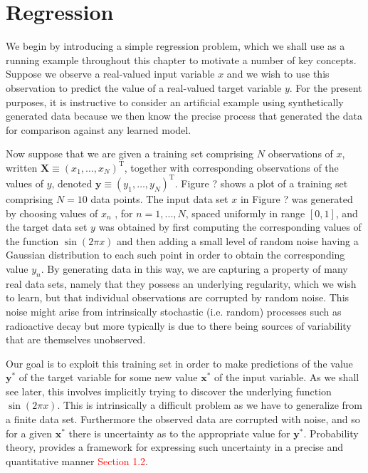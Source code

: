 \documentclass{article} %
\begin{document}
\section{Regression}

We begin by introducing a simple regression problem, which we shall use as a running example throughout this chapter to motivate a number of key concepts. Suppose we observe a real-valued input variable $x$ and we wish to use this observation to predict the value of a real-valued target variable $y$. For the present purposes, it is instructive to consider an artificial example using synthetically generated data because we then know the precise process that generated the data for comparison against any learned model.

Now suppose that we are given a training set comprising $N$ observations of $x$, written $\mathbf{X} \equiv\left(x_{1}, \dots, x_{N}\right)^{\mathrm{T}}$, together with corresponding observations of the values of $y$, denoted $\mathbf{y} \equiv\left(y_{1}, \dots, y_{N}\right)^{\mathrm{T}}$. Figure ? shows a plot of a training set comprising $N = 10$ data points. The input data set $x$ in Figure ? was generated by choosing values of $x_n$ , for $n = 1, . . . , N$, spaced uniformly in range $[0, 1]$, and the target data set $y$ was obtained by first computing the corresponding values of the function $\sin(2\pi x)$ and then adding a small level of random noise having a Gaussian distribution to each such point in order to obtain the corresponding value $y_n$. By generating data in this way, we are capturing a property of many real data sets, namely that they possess an underlying regularity, which we wish to learn, but that individual observations are corrupted by random noise. This noise might arise from intrinsically stochastic (i.e. random) processes such as radioactive decay but more typically is due to there being sources of variability that are themselves unobserved.

Our goal is to exploit this training set in order to make predictions of the value $\mathbf{y}^*$ of the target variable for some new value $\mathbf{x}^*$ of the input variable. As we shall see later, this involves implicitly trying to discover the underlying function $\sin(2\pi x)$. This is intrinsically a difficult problem as we have to generalize from a finite data set. Furthermore the observed data are corrupted with noise, and so for a given $\mathbf{x}^*$ there is uncertainty as to the appropriate value for $\mathbf{y}^*$. Probability theory, provides a framework for expressing such uncertainty in a precise and quantitative manner \textcolor{red}{Section 1.2}.
\end{document}

